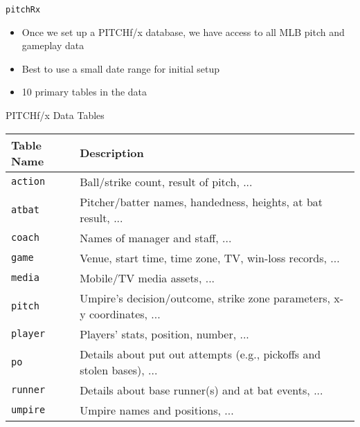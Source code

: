 \begin{frame}{\texttt{pitchRx}}

\begin{itemize}
\tightlist
\item
  Once we set up a PITCHf/x database, we have access to all MLB pitch
  and gameplay data
\item
  Best to use a small date range for initial setup
\item
  10 primary tables in the data
\end{itemize}

\end{frame}

\begin{frame}{PITCHf/x Data Tables}

\small

\begin{table}[ht]
\centering
\begin{tabular}{ll}
\hline
Table Name & Description \\ 
\hline
{\texttt{action}} & Ball/strike count, result of pitch, ... \\ 
{\texttt{atbat}} & Pitcher/batter names, handedness, heights, at bat result, ... \\ 
{\texttt{coach}} & Names of manager and staff, ... \\ 
{\texttt{game}} & Venue, start time, time zone, TV, win-loss records, ... \\ 
{\texttt{media}} & Mobile/TV media assets, ... \\ 
{\texttt{pitch}} & Umpire's decision/outcome, strike zone parameters, x-y coordinates, ... \\ 
{\texttt{player}} & Players' stats, position, number, ... \\ 
{\texttt{po}} & Details about put out attempts (e.g., pickoffs and stolen bases), ... \\ 
{\texttt{runner}} & Details about base runner(s) and at bat events, ... \\ 
{\texttt{umpire}} & Umpire names and positions, ... \\ 
\hline
\end{tabular}
\end{table}

\end{frame}

